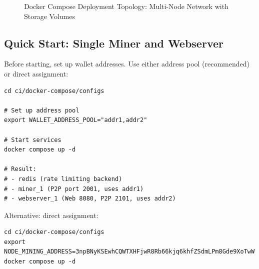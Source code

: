 \begin{figure}[htbp]
  \caption{Docker Compose Deployment Topology: Multi-Node Network with Storage Volumes}
  \label{fig:docker-topology}
\end{figure}

\subsection{Quick Start: Single Miner and Webserver}

Before starting, set up wallet addresses. Use either address pool (recommended) or direct assignment:

\begin{listing}[htbp]
\caption{Quick Start: Address Pool Method}
\label{lst:ch22-quickstart-pool}
\begin{verbatim}
cd ci/docker-compose/configs

# Set up address pool
export WALLET_ADDRESS_POOL="addr1,addr2"

# Start services
docker compose up -d

# Result:
# - redis (rate limiting backend)
# - miner_1 (P2P port 2001, uses addr1)
# - webserver_1 (Web 8080, P2P 2101, uses addr2)
\end{verbatim}
\end{listing}

Alternative: direct assignment:

\begin{listing}[htbp]
\caption{Quick Start: Direct Assignment}
\label{lst:ch22-quickstart-direct}
\begin{verbatim}
cd ci/docker-compose/configs
export NODE_MINING_ADDRESS=3npBNyKSEwhCQWTXHFjwR8Rb66kjq6khfZSdmLPm8Gde9XoTwW
docker compose up -d
\end{verbatim}
\end{listing}


